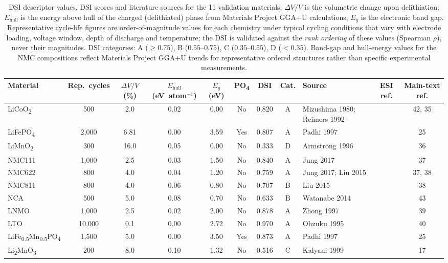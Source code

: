 \documentclass[10pt]{article}
\begin{document}
\begin{table}[htbp]
\centering
\caption{DSI descriptor values, DSI scores and literature sources for the 11 validation materials. $\Delta V/V$ is the volumetric change upon delithiation; $E_\mathrm{hull}$ is the energy above hull of the charged (delithiated) phase from Materials Project GGA+U calculations; $E_g$ is the electronic band gap. Representative cycle-life figures are order-of-magnitude values for each chemistry under typical cycling conditions that vary with electrode loading, voltage window, depth of discharge and temperature; the DSI is validated against the \emph{rank ordering} of these values (Spearman $\rho$), never their magnitudes. DSI categories: A ($\geq 0.75$), B ($0.55$--$0.75$), C ($0.35$--$0.55$), D ($<0.35$). Band-gap and hull-energy values for the NMC compositions reflect Materials Project GGA+U trends for representative ordered structures rather than specific experimental measurements.}
\label{tab:s1_sources}
\setlength{\tabcolsep}{4pt}
\renewcommand{\arraystretch}{1.25}
\footnotesize
\begin{tabular}{l c c c c c c c l c c}
\hline
\textbf{Material} & \textbf{Rep.\ cycles} & \textbf{$\Delta V/V$ (\%)} & \textbf{$E_\mathrm{hull}$ (eV~atom$^{-1}$)} & \textbf{$E_g$ (eV)} & \textbf{PO\textsubscript{4}} & \textbf{DSI} & \textbf{Cat.} & \textbf{Source} & \textbf{ESI ref.} & \textbf{Main-text ref.} \\
\hline
LiCoO\textsubscript{2} & 500 & 2.0 & 0.02 & 0.00 & No & 0.820 & A & Mizushima 1980; Reimers 1992 & \cite{Mizushima1980,Reimers1992} & 42, 35 \\
LiFePO\textsubscript{4} & 2,000 & 6.81 & 0.00 & 3.59 & Yes & 0.807 & A & Padhi 1997 & \cite{Padhi1997} & 25 \\
LiMnO\textsubscript{2} & 300 & 16.0 & 0.05 & 0.00 & No & 0.333 & D & Armstrong 1996 & \cite{Armstrong1996} & 36 \\
NMC111 & 1,000 & 2.5 & 0.03 & 1.50 & No & 0.840 & A & Jung 2017 & \cite{Jung2017} & 37 \\
NMC622 & 800 & 4.0 & 0.04 & 1.20 & No & 0.759 & A & Jung 2017; Liu 2015 & \cite{Jung2017,Liu2015} & 37, 38 \\
NMC811 & 800 & 4.0 & 0.06 & 0.80 & No & 0.707 & B & Liu 2015 & \cite{Liu2015} & 38 \\
NCA & 500 & 5.0 & 0.08 & 0.70 & No & 0.633 & B & Watanabe 2014 & \cite{Watanabe2014} & 43 \\
LNMO & 1,000 & 2.5 & 0.02 & 2.00 & No & 0.878 & A & Zhong 1997 & \cite{Zhong1997} & 39 \\
LTO & 10,000 & 0.1 & 0.00 & 2.72 & No & 0.970 & A & Ohzuku 1995 & \cite{Ohzuku1995} & 40 \\
LiFe\textsubscript{0.5}Mn\textsubscript{0.5}PO\textsubscript{4} & 1,500 & 5.0 & 0.00 & 3.50 & Yes & 0.873 & A & Padhi 1997 & \cite{Padhi1997} & 25 \\
Li\textsubscript{2}MnO\textsubscript{3} & 200 & 8.0 & 0.10 & 1.32 & No & 0.516 & C & Kalyani 1999 & \cite{Kalyani1999} & 17 \\
\hline
\end{tabular}


\end{table}
\end{document}
